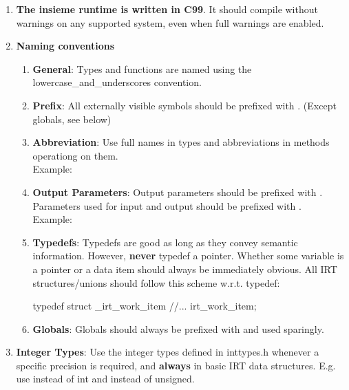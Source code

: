\begin{enumerate}

\item \textbf{The insieme runtime is written in C99}. It should compile without warnings on any supported system, even when full warnings are enabled.

\item \textbf{Naming conventions}
\begin{enumerate}

\item \textbf{General}: Types and functions are named using the lowercase\_and\_underscores convention.

\item \textbf{Prefix}: All externally visible symbols should be prefixed with . (Except globals, see below)

\item \textbf{Abbreviation}: Use full names in types and abbreviations in methods operationg on them.\\
Example: 

\item \textbf{Output Parameters}: Output parameters should be prefixed with . Parameters used for input and output should be prefixed with . \\
Example: 

\item \textbf{Typedefs}: Typedefs are good as long as they convey semantic information. However, \textbf{never} typedef a pointer. Whether some variable is a pointer or a data item should always be immediately obvious.
All IRT structures/unions should follow this scheme w.r.t. typedef:
\begin{srcCode}
typedef struct _irt_work_item {
	//...
} irt_work_item;
\end{srcCode}

\item \textbf{Globals}: Globals should always be prefixed with  and used sparingly.
\end{enumerate}

\item \textbf{Integer Types}:
Use the integer types defined in inttypes.h whenever a specific precision is
required, and \textbf{always} in basic IRT data structures.
E.g. use  instead of int and  instead of unsigned.


\end{enumerate}
